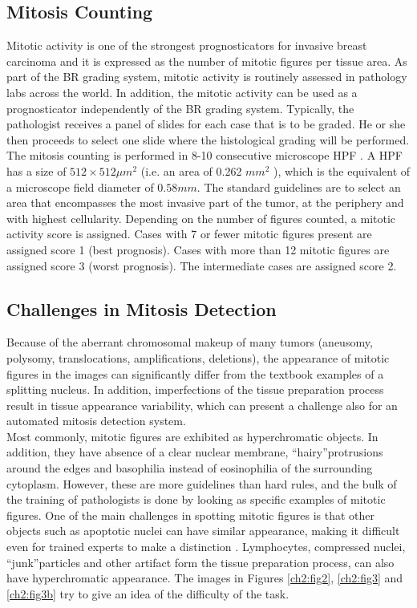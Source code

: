 \subsection{Mitosis Counting}
Mitotic activity is one of the strongest prognosticators for invasive breast carcinoma and it
is expressed as the number of mitotic figures per tissue area. As part of the \Gls{BR} grading system, mitotic activity is
routinely assessed in pathology labs across the world. In addition, the mitotic activity
can be used as a prognosticator independently of the \Gls{BR} grading system.
Typically, the pathologist receives a panel of slides for each case that is to be graded. He
or she then proceeds to select one slide where the histological grading will be
performed. The mitosis counting is performed in 8-10 consecutive microscope \Gls{HPF} \cite{breastCancerMitosisPCA_ICA}. 
A HPF has a size of $512 \times 512 \mu m^{2}$ (i.e. an area of 0.262 $mm^{2}$ ), which is the equivalent of a microscope field diameter of $0.58mm$.
The standard guidelines are to select an area that encompasses the most invasive
part of the tumor, at the periphery and with highest cellularity. Depending on the
number of figures counted, a mitotic activity score is assigned. Cases with 7 or fewer
mitotic figures present are assigned score 1 (best prognosis). Cases with more than 12
mitotic figures are assigned score 3 (worst prognosis). The intermediate cases are
assigned score 2.

\subsection{Challenges in Mitosis Detection}
Because of the aberrant chromosomal makeup of many tumors (aneusomy, polysomy,
translocations, amplifications, deletions), the appearance of mitotic figures in the
images can significantly differ from the textbook examples of a splitting nucleus\cite{mitosisDetectBreastCancer01}. In
addition, imperfections of the tissue preparation process result in tissue appearance
variability, which can present a challenge also for an automated mitosis detection system.\\
Most commonly, mitotic figures are exhibited as hyperchromatic objects. In addition,
they have absence of a clear nuclear membrane, \textquotedblleft hairy\textquotedblright protrusions around the edges
and basophilia instead of eosinophilia of the surrounding cytoplasm. However, these are
more guidelines than hard rules, and the bulk of the training of pathologists is done by
looking as specific examples of mitotic figures.
One of the main challenges in spotting mitotic figures is that other objects such as
apoptotic nuclei can have similar appearance, making it
difficult even for trained experts to make a distinction \cite{mitosisDetectionLearningBased}. Lymphocytes, compressed
nuclei, \textquotedblleft junk\textquotedblright particles and other artifact form the tissue preparation process, can also
have hyperchromatic appearance.
The images in Figures \ref{ch2:fig2}, \ref{ch2:fig3} and \ref{ch2:fig3b} try to give an idea of the difficulty of the task.

